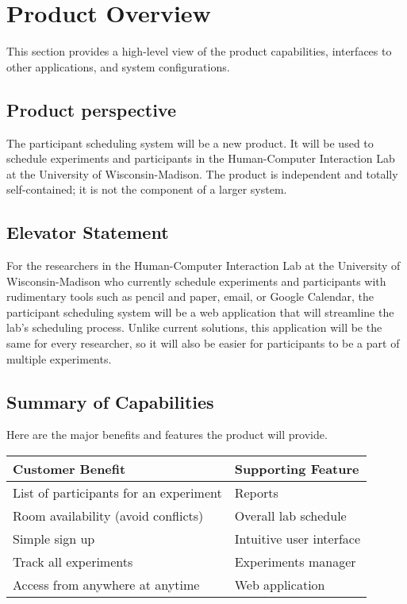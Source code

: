 \documentclass{article}
\begin{document}
\section{Product Overview}
This section provides a high-level view of the product capabilities, interfaces to other applications, and system configurations.

\subsection{Product perspective}
The participant scheduling system will be a new product. It will be used to schedule experiments and participants in the Human-Computer Interaction Lab at the University of Wisconsin-Madison. The product is independent and totally self-contained; it is not the component of a larger system.

\subsection{Elevator Statement}
For the researchers in the Human-Computer Interaction Lab at the University of Wisconsin-Madison who currently schedule experiments and participants with rudimentary tools such as pencil and paper, email, or Google Calendar, the participant scheduling system will be a web application that will streamline the lab's scheduling process. Unlike current solutions, this application will be the same for every researcher, so it will also be easier for participants to be a part of multiple experiments.

\subsection{Summary of Capabilities}
Here are the major benefits and features the product will provide.
\begin{table}[!hb]
    \begin{tabular}{|l|l|}
        \hline
        Customer Benefit & Supporting Feature \\ \hline
        List of participants for an experiment & Reports \\ \hline
        Room availability (avoid conflicts) & Overall lab schedule \\ \hline
        Simple sign up & Intuitive user interface \\ \hline
        Track all experiments & Experiments manager \\ \hline
        Access from anywhere at anytime & Web application \\ \hline
    \end{tabular}
\end{table}
\end{document}
